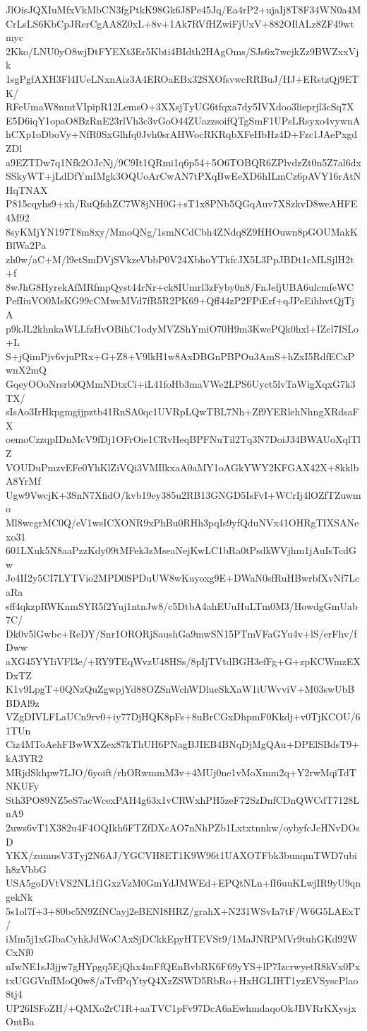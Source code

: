 JlOisJQXIuMfxVkMbCN3fgPtkK98Gk6J8Pe45Jq/Ea4rP2+ujaIj8T8F34WN0a4M
CrLsLS6KbCpJRerCgAA8Z0xL+8v+1Ak7RVfHZwiFjUxV+882OIlALz8ZF49wtmyc
2Kko/LNU0yO8wjDtFYEXt3Er5Kbti4BIdth2HAgOms/SJs6x7wcjkZz9BWZxxVjk
1sgPgfAXH3Fl4IUeLNxnAiz3A4EROaEBx32SXOfsvwcRRBuJ/HJ+ERstzQj9ETK/
RFeUmaW8nmtVIpipR12LemsO+3XXsjTyUG6tfqxa7dy5IVXdoo3lieprjl3cSq7X
E5D6iqY1opaO8BzRnE23rlVh3c3vGoO44ZUazzsoifQTgSmF1UPsLRsyxo4vywnA
hCXp1oDboVy+NfR0SxGlhfq0Jvh0srAHWocRKRqbXFeHbHz4D+Fzc1JAePxgdZDl
a9EZTDw7q1Nfk2OJcNj/9C9It1QRmi1q6p54+5O6TOBQR6ZPlvdzZt0n5Z7al6dx
SSkyWT+jLdDfYmIMgk3OQUoArCwAN7tPXqBwEeXD6hILmCz6pAVY16rAtNHqTNAX
P815cqyhs9+xh/RuQfshZC7W8jNH0G+sT1x8PNb5QGqAuv7XSzkvD8weAHFE4M92
8syKMjYN197T8m8xy/MmoQNg/1smNCdCbh4ZNdq8Z9HHOuwn8pGOUMakKBlWa2Pa
zh0w/aC+M/l9etSmDVjSVkzeVbbP0V24XbhoYTkfcJX5L3PpJBDt1cMLSjlH2t+f
8wJhG8HyrekAfMRfmpQyst44rNr+ck8IUmrl3zFyby0n8/FnJefjUBA6ulcmfeWC
PefIiuVO0MsKG99cCMwcMVd7fR5R2PK69+Qff44zP2FPiErf+qJPeEihhvtQjTjA
p9kJL2khnkaWLLfzHvOBihC1odyMVZShYmiO70H9m3KwePQk0hxl+IZcl7ISLo+L
S+jQimPjv6vjuPRx+G+Z8+V9lkH1w8AxDBGnPBPOu3AmS+hZxI5RdfECxPwnX2mQ
GqeyOOoNrsrb0QMmNDtxCi+iL41foHb3maVWe2LPS6Uyct5lvTaWigXqxG7k3TX/
sIsAo3IrHkpgmgijpztb41RnSA0qc1UVRpLQwTBL7Nh+Zf9YERlehNhngXRdsaFX
oemoCzzqpIDnMcV9fDj1OFrOie1CRvHeqBPFNuTil2Tq3N7DoiJ34BWAUoXqlTlZ
VOUDuPmzvEFe0YhKlZiVQi3VMIlkxaA0aMY1oAGkYWY2KFGAX42X+8kklbA8YrMf
Ugw9VwcjK+3SnN7XfidO/kvb19ey385u2RB13GNGD5IsFvI+WCrIj4lOZfTZuwmo
Ml8wcgrMC0Q/eV1wsICXONR9xPhBu0RHh3pqIs9yfQduNVx41OHRgTIXSANexo31
601LXuk5N8aaPzzKdy09tMFek3zMseaNejKwLC1bRa0tPsdkWVjhm1jAuIsTcdGw
Je4II2y5CI7LYTVio2MPD0SPDuUW8wKuyoxg9E+DWaN0sfRuHBwrbfXvNf7LcaRa
sff4qkzpRWKnmSYR5f2Yuj1ntnJw8/c5DtbA4ahEUuHuLTm0M3/HowdgGmUab7C/
Dk0v5lGwbc+ReDY/Snr1ORORjSaushGa9mwSN15PTmVFaGYu4v+lS/erFhv/fDww
aXG45YYIiVFl3e/+RY9TEqWvzU48HSs/8pIjTVtdBGH3efFg+G+zpKCWmzEXDxTZ
K1v9LpgT+0QNzQuZgwpjYd88OZSnWchWDlueSkXaW1iUWvviV+M03swUbBBDAl9z
VZgDIVLFLaUCn9rv0+iy77DjHQK8pFs+8uBrCGxDhpmF0Kkdj+v0TjKCOU/61TUn
Ciz4MToAehFBwWXZex87kThUH6PNagBJIEB4BNqDjMgQAu+DPElSBdsT9+kA3YR2
MRjdSkhpw7LJO/6yoift/rhORwmmM3v+4MUj0ne1vMoXmm2q+Y2rwMqiTdTNKUFy
Sth3PO89NZ5eS7acWcexPAH4g63x1vCRWxhPH5zeF72SzDnfCDnQWCdT7128LnA9
2uws6vT1X382u4F4OQIkh6FTZfDXcAO7nNhPZb1Lxtxtnnkw/oybyfcJcHNvDOsD
YKX/zumusV3Tyj2N6AJ/YGCVH8ET1K9W96t1UAXOTFbk3bunqmTWD7ubih8zVbbG
USA5goDVtVS2NL1f1GxzVzM0GmYdJMWEd+EPQtNLn+fI6uuKLwjIR9yU9qngekNk
5s1ol7f+3+80bc5N9ZfNCayj2eBENI8HRZ/grahX+N231WSvIa7tF/W6G5LAExT/
iMm5j1xGIbaCyhkJdWoCAxSjDCkkEpyHTEVSt9/1MaJNRPMVr9tuhGKd92WCxNf0
nIwNE1sJ3jjw7gHYpgq5EjQhx4mFfQEnBvbRK6F69yYS+lP7IzcrwyetR8kVx0Px
txUGGVnfIMoQ0w8/aTvfPqYtyQ4XzZSWD5RbRo+HxHGLIHT1yzEVSyscPlao8tj4
UP26ISFoZH/+QMXo2rC1R+aaTVC1pFv97DcA6aEwhmdaqoOkJBVRrKXysjxOntBa
